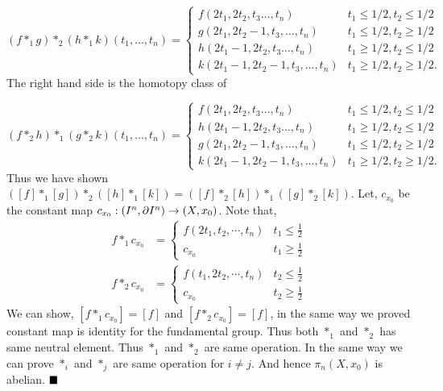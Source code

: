 \documentclass[11pt]{article}
\begin{document}
\begin{itemize}
    $$
    (f \ast_1  g)\ast_2(h \ast_1  k)\left(t_{1}, \ldots, t_{n}\right)= \begin{cases}f\left(2 t_{1}, 2 t_{2}, t_{3} \ldots, t_{n}\right) & t_{1} \leq 1 / 2, t_{2} \leq 1 / 2 \\ g\left(2 t_{1}, 2 t_{2}-1, t_{3}, \ldots, t_{n}\right) & t_{1} \leq 1 / 2, t_{2} \geq 1 / 2 \\ h\left(2 t_{1}-1,2 t_{2}, t_{3} \ldots, t_{n}\right) & t_{1} \geq 1 / 2, t_{2} \leq 1 / 2 \\ k\left(2 t_{1}-1,2 t_{2}-1, t_{3}, \ldots, t_{n}\right) & t_{1} \geq 1 / 2, t_{2} \geq 1 / 2 .\end{cases}
    $$
    The right hand side is the homotopy class of

$$
(f\ast_2 h) \ast_1 (g\ast_2 k)\left(t_{1}, \ldots, t_{n}\right)= \begin{cases}f\left(2 t_{1}, 2 t_{2}, t_{3} \ldots, t_{n}\right) & t_{1} \leq 1 / 2, t_{2} \leq 1 / 2 \\ h\left(2 t_{1}-1,2 t_{2}, t_{3} \ldots, t_{n}\right) & t_{1} \geq 1 / 2, t_{2} \leq 1 / 2 \\ g\left(2 t_{1}, 2 t_{2}-1, t_{3}, \ldots, t_{n}\right) & t_{1} \leq 1 / 2, t_{2} \geq 1 / 2 \\ k\left(2 t_{1}-1,2 t_{2}-1, t_{3}, \ldots, t_{n}\right) & t_{1} \geq 1 / 2, t_{2} \geq 1 / 2 .\end{cases}
$$
    Thus we have shown $([f] \ast_1 [g])\ast_2([h] \ast_1 [k])=([f]\ast_2[h]) \ast_1 ([g]\ast_2[k])$. Let, $c_{x_0}$ be the constant map $c_{x_0}:(I^n,\partial I^n) \to (X,x_0)$. Note that,
     \begin{align*}
        f\ast_1  c_{x_0} &= \begin{cases}
            f(2t_1,t_2,\cdots,t_n) & t_1 \leq \frac{1}{2}\\
            c_{x_0} & t_1 \geq \frac{1}{2}
        \end{cases} \\
        f\ast_2  c_{x_0} &= \begin{cases}
            f(t_1,2t_2,\cdots,t_n) & t_2 \leq \frac{1}{2}\\
            c_{x_0} & t_2 \geq \frac{1}{2}
        \end{cases} 
    \end{align*}
    We can show, $[f\ast_1  c_{x_0}]=[f]$ and $[f\ast_2  c_{x_0}] = [f]$, in the same way we proved constant map is identity for the fundamental group. Thus both $\ast_1$ and $\ast_2$ has same neutral element. Thus $\ast_1$ and $\ast_2$ are same operation. In the same way we can prove $\ast_i$ and $\ast_j$ are same operation for $i \neq j$. And hence $\pi_n(X,x_0)$ is abelian. $\hfill \blacksquare$
 \end{itemize}
 
\end{document}
